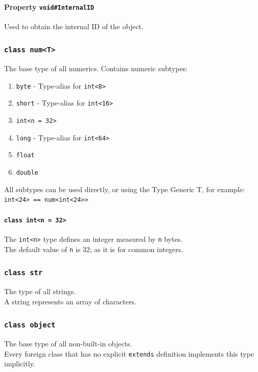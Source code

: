 \documentclass{docs}
\begin{document}
    \label{propVoidInternalID}
    \paragraph{Property \texttt{void\#InternalID}}
    Used to obtain the internal ID of the object.
    
    \label{typeNum}
    \subsubsection{\texttt{class num<T>}}
    The base type of all numerics. Contains numeric subtypes:
    \begin{enumerate}
        \item \texttt{byte} - Type-alias for \texttt{int<8>} %
        \item \texttt{short} - Type-alias for \texttt{int<16>}
        \item \texttt{int<n = 32>}
        \item \texttt{long} - Type-alias for \texttt{int<64>}
        \item \texttt{float}
        \item \texttt{double}
    \end{enumerate}
    All subtypes can be used directly, or using the Type Generic T, for example: \texttt{int<24> == num<int<24>>}
    \label{typeInt}
    \paragraph{\texttt{class int<n = 32>}}
    The \texttt{int<n>} type defines an integer measured by \texttt{n} bytes. \\
    The default value of \texttt{n} is 32; as it is for common integers.
    
    \label{typeStr}
    \subsubsection{\texttt{class str}}
    The type of all strings.
    \\
    A string represents an array of characters.
    
    \label{typeObject}
    \subsubsection{\texttt{class object}}
    The base type of all non-built-in objects.
    \\
    Every foreign class that has no explicit \texttt{extends} definition implements this type implicitly.
    
\end{document}
